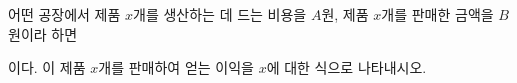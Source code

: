 어떤 공장에서 제품 $x$개를 생산하는 데 드는 비용을 $A$원, 제품 $x$개를 판매한 금액을 $B$원이라 하면\par\smallskip{}\par\smallskip\noindent 이다. 이 제품 $x$개를 판매하여 얻는 이익을 $x$에 대한 식으로 나타내시오.
